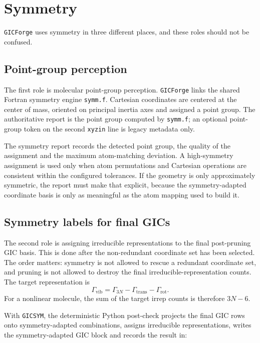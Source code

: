 \documentclass[11pt]{article}
\newcommand{\program}{\texttt{GICForge}}
\newcommand{\xyzin}{\texttt{xyzin}}
\begin{document}
\section{Symmetry}

\program{} uses symmetry in three different places, and these roles should not
be confused.

\subsection{Point-group perception}

The first role is molecular point-group perception.  \program{} links the
shared Fortran symmetry engine \texttt{symm.f}.  Cartesian coordinates are
centered at the center of mass, oriented on principal inertia axes and assigned
a point group.  The authoritative report is the point group computed by
\texttt{symm.f}; an optional point-group token on the second \xyzin{} line is
legacy metadata only.

The symmetry report records the detected point group, the quality of the
assignment and the maximum atom-matching deviation.  A high-symmetry assignment
is used only when atom permutations and Cartesian operations are consistent
within the configured tolerances.  If the geometry is only approximately
symmetric, the report must make that explicit, because the symmetry-adapted
coordinate basis is only as meaningful as the atom mapping used to build it.

\subsection{Symmetry labels for final GICs}

The second role is assigning irreducible representations to the final
post-pruning GIC basis.  This is done after the non-redundant coordinate set has
been selected.  The order matters: symmetry is not allowed to rescue a
redundant coordinate set, and pruning is not allowed to destroy the final
irreducible-representation counts.  The target representation is
\[
  \Gamma_\mathrm{vib} = \Gamma_{3N}-\Gamma_\mathrm{trans}-\Gamma_\mathrm{rot}.
\]
For a nonlinear molecule, the sum of the target irrep counts is therefore
\(3N-6\).

With \texttt{GICSYM}, the deterministic Python post-check projects the final
GIC rows onto symmetry-adapted combinations, assigns irreducible
representations, writes the symmetry-adapted GIC block and records the result
in:
\end{document}
